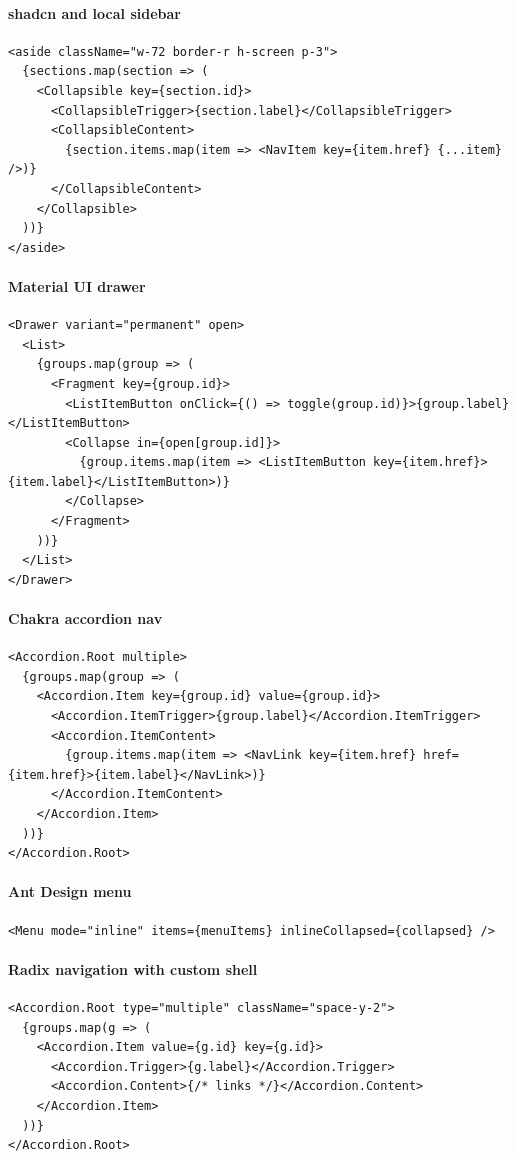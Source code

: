 \paragraph{shadcn and local sidebar}
\begin{verbatim}
<aside className="w-72 border-r h-screen p-3">
  {sections.map(section => (
    <Collapsible key={section.id}>
      <CollapsibleTrigger>{section.label}</CollapsibleTrigger>
      <CollapsibleContent>
        {section.items.map(item => <NavItem key={item.href} {...item} />)}
      </CollapsibleContent>
    </Collapsible>
  ))}
</aside>
\end{verbatim}

\paragraph{Material UI drawer}
\begin{verbatim}
<Drawer variant="permanent" open>
  <List>
    {groups.map(group => (
      <Fragment key={group.id}>
        <ListItemButton onClick={() => toggle(group.id)}>{group.label}</ListItemButton>
        <Collapse in={open[group.id]}>
          {group.items.map(item => <ListItemButton key={item.href}>{item.label}</ListItemButton>)}
        </Collapse>
      </Fragment>
    ))}
  </List>
</Drawer>
\end{verbatim}

\paragraph{Chakra accordion nav}
\begin{verbatim}
<Accordion.Root multiple>
  {groups.map(group => (
    <Accordion.Item key={group.id} value={group.id}>
      <Accordion.ItemTrigger>{group.label}</Accordion.ItemTrigger>
      <Accordion.ItemContent>
        {group.items.map(item => <NavLink key={item.href} href={item.href}>{item.label}</NavLink>)}
      </Accordion.ItemContent>
    </Accordion.Item>
  ))}
</Accordion.Root>
\end{verbatim}

\paragraph{Ant Design menu}
\begin{verbatim}
<Menu mode="inline" items={menuItems} inlineCollapsed={collapsed} />
\end{verbatim}

\paragraph{Radix navigation with custom shell}
\begin{verbatim}
<Accordion.Root type="multiple" className="space-y-2">
  {groups.map(g => (
    <Accordion.Item value={g.id} key={g.id}>
      <Accordion.Trigger>{g.label}</Accordion.Trigger>
      <Accordion.Content>{/* links */}</Accordion.Content>
    </Accordion.Item>
  ))}
</Accordion.Root>
\end{verbatim}

